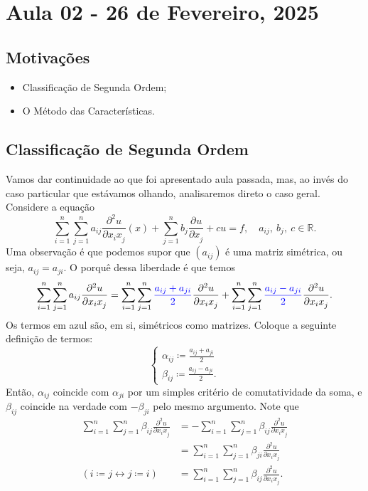 \documentclass[.../pde_notes.tex]{subfiles}
\begin{document}
\section{Aula 02 - 26 de Fevereiro, 2025}
\subsection{Motivações}
\begin{itemize}
	\item Classificação de Segunda Ordem;
	\item O Método das Características.
\end{itemize}
\subsection{Classificação de Segunda Ordem}
Vamos dar continuidade ao que foi apresentado aula passada, mas, ao invés do caso particular que estávamos olhando, analisaremos direto o caso geral. Considere a equação
\[
	\sum\limits_{i=1}^{n}\sum\limits_{j=1}^{n}a_{ij}\frac{\partial^{2}u}{\partial x_{i}x_{j}^{}}(x) + \sum\limits_{j=1}^{n}b_{j}\frac{\partial^{}u}{\partial x_{j}^{}} + cu = f,\quad a_{ij},\: b_{j}, \: c\in \mathbb{R}.
\]
Uma observação é que podemos supor que \((a_{ij})\) é uma matriz simétrica, ou seja, \(a_{ij} = a_{ji}.\) O porquê dessa liberdade é que temos
\[
	\sum\limits_{i=1}^{n}\sum\limits_{j=1}^{n}a_{ij}\frac{\partial^{2}u}{\partial x_{i}x_{j}^{}} = \sum\limits_{i=1}^{n}\sum\limits_{j=1}^{n}\color{blue}\frac{a_{ij}+a_{ji}}{2}\color{black}\frac{\partial^{2}u}{\partial x_{i}x_{j}^{}} + \sum\limits_{i=1}^{n}\sum\limits_{j=1}^{n}\color{blue}\frac{a_{ij}-a_{ji}}{2}\color{black}\frac{\partial^{2}u}{\partial x_{i}x_{j}^{}}.
\]
Os termos em azul são, em si, simétricos como matrizes. Coloque a seguinte definição de termos:
\[
	\left\{\begin{array}{ll}
		\alpha_{ij}\coloneqq \frac{a_{ij}+a_{ji}}{2} \\
		\beta_{ij}\coloneqq \frac{a_{ij}-a_{ji}}{2}.
	\end{array}\right.
\]
Então, \(\alpha_{ij}\) coincide com \(\alpha_{ji}\) por um simples critério de comutatividade da soma, e \(\beta_{ij}\) coincide na verdade com \(-\beta_{ji}\) pelo mesmo argumento. Note que
\begin{align*}
	\sum\limits_{i=1}^{n}\sum\limits_{j=1}^{n}\beta_{ij}\frac{\partial^{2}u}{\partial x_{i}x_{j}^{}} & = - \sum\limits_{i=1}^{n}\sum\limits_{j=1}^{n}\beta_{ij}\frac{\partial^{2}u}{\partial x_{i}x_{j}^{}} \\
	                                                                                                 & = \sum\limits_{i=1}^{n}\sum\limits_{j=1}^{n}\beta_{ji}\frac{\partial^{2}u}{\partial x_{i}x_{j}^{}}   \\
	(i\coloneqq j \longleftrightarrow j\coloneqq i)                                                  & = \sum\limits_{i=1}^{n}\sum\limits_{j=1}^{n}\beta_{ij}\frac{\partial^{2}u}{\partial x_{i}x_{j}^{}}.
\end{align*}
\end{document}
